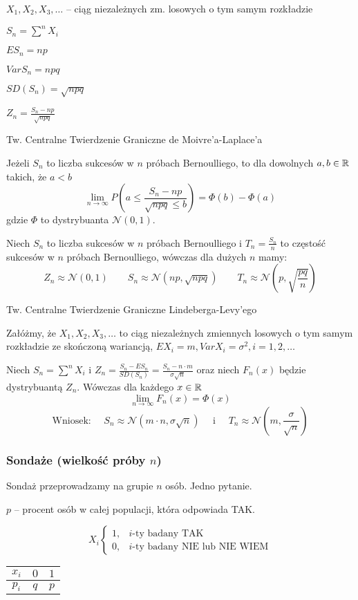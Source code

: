 \documentclass[../Matematyka.tex]{subfiles}
\begin{document}
\(X_1, X_2, X_3, \ldots\) -- ciąg niezależnych zm. losowych o tym samym rozkładzie

\(S_n = \sum^n X_i\)

\(ES_n = np\)

\(VarS_n = npq\)

\(SD(S_n) = \sqrt{npq}\)

\(Z_n = \frac{S_n - np}{\sqrt{npq}}\)

Tw. Centralne Twierdzenie Graniczne de Moivre'a-Laplace'a

Jeżeli \(S_n\) to liczba sukcesów w \(n\) próbach Bernoulliego, to dla dowolnych \(a, b \in \mathbb{R}\) takich, że \(a < b\)
\[\lim_{n\rightarrow\infty} P(a \leq \frac{S_n - np}{\sqrt{npq} \leq b}) = \Phi(b) - \Phi(a)\]
gdzie \(\Phi\) to dystrybuanta \(\mathcal{N}(0,1)\).

Niech \(S_n\) to liczba sukcesów w \(n\) próbach Bernoulliego i \(T_n = \frac{S_n}{n}\) to częstość sukcesów w \(n\) próbach Bernoulliego, wówczas dla dużych \(n\) mamy:
\[Z_n \approx \mathcal{N}(0,1) \qquad S_n \approx \mathcal{N}(np, \sqrt{npq}) \qquad T_n \approx \mathcal{N}(p, \sqrt{\frac{pq}{n}})\]

Tw. Centralne Twierdzenie Graniczne Lindeberga-Levy'ego

Załóżmy, że \(X_1, X_2, X_3, \ldots\) to ciąg niezależnych zmiennych losowych o tym samym rozkładzie ze skończoną wariancją, \(EX_i = m, VarX_i=\sigma^2, i=1,2,\ldots\)

Niech \(S_n = \sum^n X_i\) i \(Z_n = \frac{S_n - ES_n}{SD(S_n)} = \frac{S_n - n \cdot m}{\sigma\sqrt{n}}\) oraz niech \(F_n(x)\) będzie dystrybuantą \(Z_n\). Wówczas dla każdego \(x \in \mathbb{R}\)
\[\lim_{n\rightarrow\infty}F_n(x) = \Phi(x)\]
\[\text{Wniosek: }\quad S_n \approx \mathcal{N}(m\cdot n, \sigma\sqrt{n}) \quad\text{ i }\quad T_n \approx \mathcal{N}(m, \frac{\sigma}{\sqrt{n}})\]

\subsubsection*{Sondaże (wielkość próby \(n\))}
Sondaż przeprowadzamy na grupie \(n\) osób. Jedno pytanie.

\(p\) -- procent osób w całej populacji, która odpowiada TAK.

\begin{multicols}{2}
    \[X_i \begin{cases}
        1, & i\text{-ty badany TAK}\\
        0, & i\text{-ty badany NIE lub NIE WIEM}
    \end{cases}\]

    \begin{table}[H]
        \centering
        \begin{tabular}{c|c|c}
            \(x_i\) & \(0\) & \(1\) \\\hline
            \(p_i\) & \(q\) & \(p\)
        \end{tabular}
    \end{table}
\end{multicols}
\end{document}

